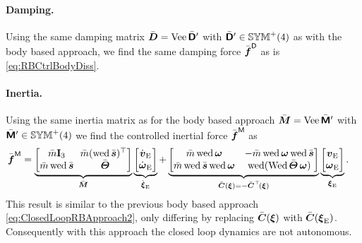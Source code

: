 
\paragraph{Damping.}
Using the same damping matrix $\sysDissMatC = \veeMatOp\bodyDissMatCp{}{}$ with $\bodyDissMatCp{}{} \in \SymMatP(4)$ as with the body based approach, we find the same damping force $\genForceDissC$ as is \eqref{eq:RBCtrlBodyDiss}. 

\paragraph{Inertia.}
Using the same inertia matrix as for the body based approach $\sysInertiaMatC = \veeMatOp\bodyInertiaMatCp{}{}$ with $\bodyInertiaMatCp{}{} \in \SymMatP(4)$ we find the controlled inertial force $\genForceInertiaC$ as
\begin{align}\label{eq:RBCtrlEnergy}
 \genForceInertiaC
 &= \underbrace{\begin{bmatrix} \mc \idMat[3] & \!\!\mc (\wedOp\sc)^\top \\ \mc \wedOp\sc & \Jc \end{bmatrix}}_{\sysInertiaMatC} \underbrace{\begin{bmatrix} \vEd \\ \wEd \end{bmatrix}}_{\sysVelEd}
 +  \underbrace{\begin{bmatrix} \mc \wedOp\w & -\mc \wedOp\w \wedOp\sc \\ \mc \wedOp\sc \wedOp\w & \wedOp(\wedMatOp\Jc\,\w) \end{bmatrix}}_{\ConnMatC(\sysVel) = -\ConnMatC^\top\!(\sysVel)} \underbrace{\begin{bmatrix} \vE \\ \wE \end{bmatrix}}_{\sysVelE}.
\end{align}
This result is similar to the previous body based approach \eqref{eq:ClosedLoopRBApproach2}, only differing by replacing $\ConnMatC(\sysVel)$ with $\ConnMatC(\sysVelE)$.
Consequently with this approach the closed loop dynamics are not autonomous.

